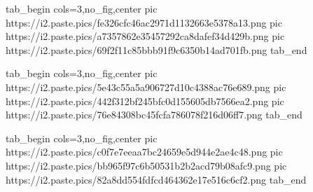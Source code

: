  
 
 
 
 
\zzSecCmtScr

\ifcmt
  tab_begin cols=3,no_fig,center
     pic https://i2.paste.pics/fe326cfc46ac2971d1132663e5378a13.png
		 pic https://i2.paste.pics/a7357862e35457292ca8dafef34d429b.png
		 pic https://i2.paste.pics/69f2f11c85bbb91f9c6350b14ad701fb.png
  tab_end
\fi

\ifcmt
  tab_begin cols=3,no_fig,center
		 pic https://i2.paste.pics/5e43c55a5a906727d10c4388ac76e689.png
		 pic https://i2.paste.pics/442f312bf245bfc0d155605db7566ea2.png
		 pic https://i2.paste.pics/76e84308bc45fcfa786078f216d06ff7.png
  tab_end
\fi

\ifcmt
  tab_begin cols=3,no_fig,center
		 pic https://i2.paste.pics/c0f7e7eeaa7bc24659e5d944e2ae4c48.png
		 pic https://i2.paste.pics/bb965f97c6b50531b2b2acd79b08afc9.png
		 pic https://i2.paste.pics/82a8dd554fdfcd464362e17e516c6cf2.png
  tab_end
\fi
